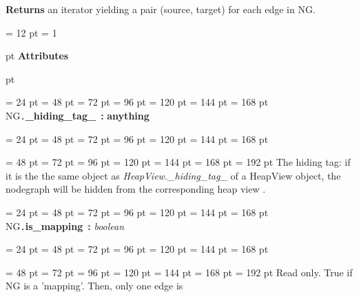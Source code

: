 {{{{{{{\bf Returns \/} an iterator yielding a pair (source, target) for each edge in NG.
\par}
\par}
\par}
\par}
\par}
{\par \pagebreak[3.300000] \noindent \hangindent = 12 pt \hangafter = 1 
{\par \pagebreak[3]  pt \noindent
{\Large {\bf Attributes\/}}\par {} pt
} \noindent
\par}
{\par \noindent  \leftskip = 24 pt  \leftmargini = 48 pt  \leftmarginii = 72 pt  \leftmarginiii = 96 pt  \leftmarginiv = 120 pt  \leftmarginv = 144 pt  \leftmarginvi = 168 pt NG{\tt .\/}{\bf {\large {\bf {\_}hiding{\_}tag{\_}\/}}\/}~{\bf :} {\bf  anything\/}\par}
{\par \noindent  \leftskip = 24 pt  \leftmargini = 48 pt  \leftmarginii = 72 pt  \leftmarginiii = 96 pt  \leftmarginiv = 120 pt  \leftmarginv = 144 pt  \leftmarginvi = 168 pt {\par \noindent
{\par \noindent  \leftskip = 48 pt  \leftmargini = 72 pt  \leftmarginii = 96 pt  \leftmarginiii = 120 pt  \leftmarginiv = 144 pt  \leftmarginv = 168 pt  \leftmarginvi = 192 pt  The hiding tag: if it is the the same object as  {\em HeapView.{\_}hiding{\_}tag{\_}\/} of a HeapView object, the nodegraph will be hidden from the corresponding heap view .
\par}
\par}
\par}
{\par \noindent  \leftskip = 24 pt  \leftmargini = 48 pt  \leftmarginii = 72 pt  \leftmarginiii = 96 pt  \leftmarginiv = 120 pt  \leftmarginv = 144 pt  \leftmarginvi = 168 pt NG{\tt .\/}{\bf {\large {\bf is{\_}mapping\/}}\/}~{\bf :}  {\em boolean\/}\par}
{\par \noindent  \leftskip = 24 pt  \leftmargini = 48 pt  \leftmarginii = 72 pt  \leftmarginiii = 96 pt  \leftmarginiv = 120 pt  \leftmarginv = 144 pt  \leftmarginvi = 168 pt {\par \noindent
{\par \noindent  \leftskip = 48 pt  \leftmargini = 72 pt  \leftmarginii = 96 pt  \leftmarginiii = 120 pt  \leftmarginiv = 144 pt  \leftmarginv = 168 pt  \leftmarginvi = 192 pt  Read only. True if NG is a 'mapping'. Then, only one edge is
}}}}

